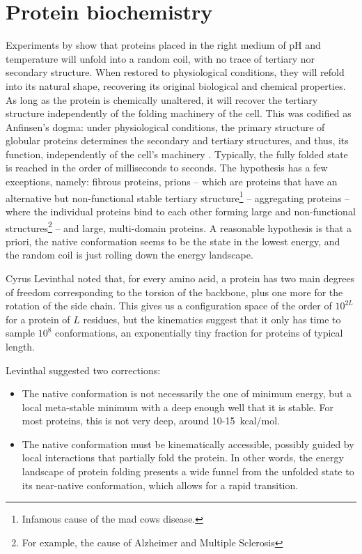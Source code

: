 \section{Protein biochemistry}

Experiments by \citet{fold_graciously} show that proteins placed in the right medium of pH and temperature will unfold into a random coil, with no trace of tertiary nor secondary structure.
When restored to physiological conditions, they will refold into its natural shape, recovering its original biological and chemical properties.
As long as the protein is chemically unaltered, it will recover the tertiary structure independently of the folding machinery of the cell.
This was codified as Anfinsen's dogma: under physiological conditions, the primary structure of globular proteins determines the secondary and tertiary structures, and thus, its function, independently of the cell's machinery \citep{Anfinsen_dogma}.
Typically, the fully folded state is reached in the order of milliseconds to seconds.
The hypothesis has a few exceptions, namely: fibrous proteins, prions -- which are proteins that have an alternative but non-functional stable tertiary structure\footnote{Infamous cause of the mad cows disease.} --  aggregating proteins -- where the individual proteins bind to each other forming large and non-functional structures\footnote{For example, the cause of Alzheimer and Multiple Sclerosis} -- and large, multi-domain proteins.
A reasonable hypothesis is that a priori, the native conformation seems to be the state in the lowest energy, and the random coil is just rolling down the energy landscape.

Cyrus Levinthal  noted that, for every amino acid, a protein has two main degrees of freedom corresponding to the torsion of the backbone, plus one more for the rotation of the side chain.
This gives us a configuration space of the order of $10^{2L}$ for a protein of $L$ residues, but the kinematics suggest that it only has time to sample $10^8$ conformations, an exponentially tiny fraction for proteins of typical length.

Levinthal suggested two corrections:
\begin{itemize}
	\item The native conformation is not necessarily the one of minimum energy, but a local meta-stable minimum with a deep enough well that it is stable.
	For most proteins, this is not very deep, around 10-\SI{15}{\kilo cal/\mol}.
	\item The native conformation must be kinematically accessible, possibly guided by local interactions that partially fold the protein.
	In other words, the energy landscape of protein folding presents a wide funnel from the unfolded state to its near-native conformation, which allows for a rapid transition.
\end{itemize}


